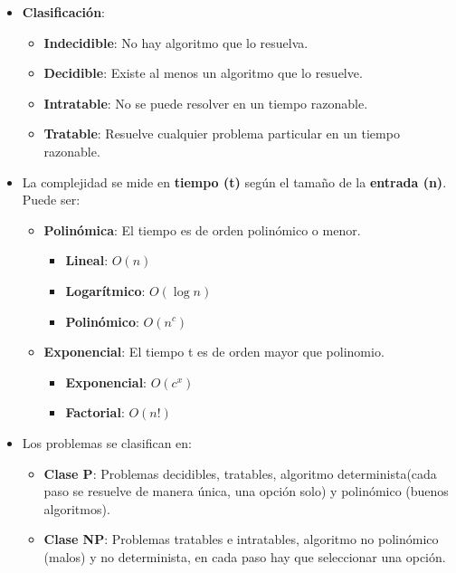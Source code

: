 \documentclass[12pt, twoside, openright]{report} %
\begin{document}
  \begin{itemize}
  \item \textbf{Clasificación}:
    

    \begin{itemize}
    \item \textbf{Indecidible}: No hay algoritmo que lo resuelva.
      
    \item \textbf{Decidible}: Existe al menos un algoritmo que lo resuelve.
      
    \item \textbf{Intratable}: No se puede resolver en un tiempo razonable.
      
    \item \textbf{Tratable}: Resuelve cualquier problema particular en un
      tiempo razonable.
      
    \end{itemize}
  \item La complejidad se mide en \textbf{tiempo (t)} según el tamaño de la
    \textbf{entrada (n)}. Puede ser:
    

    \begin{itemize}
    \item \textbf{Polinómica}: El tiempo es de orden polinómico o menor.
      

      \begin{itemize}
      \item \textbf{Lineal}: $O(n)$
        
      \item \textbf{Logarítmico}: $O(\log n)$
        
      \item \textbf{Polinómico}: $O(n^c)$
        
      \end{itemize}
    \item \textbf{Exponencial}: El tiempo t es de orden mayor que polinomio.
      

      \begin{itemize}
      \item \textbf{Exponencial}: $O(c^x)$
        
      \item \textbf{Factorial}: $O(n!)$
        
      \end{itemize}
    \end{itemize}
  \item Los problemas se clasifican en:
    

    \begin{itemize}
    \item \textbf{Clase P}: Problemas decidibles, tratables, algoritmo
      determinista(cada paso se resuelve de manera única, una opción
      solo) y polinómico (buenos algoritmos).
      
    \item \textbf{Clase NP}: Problemas tratables e intratables, algoritmo no
      polinómico (malos) y no determinista, en cada paso hay que seleccionar una opción.
      
    \end{itemize}
  \end{itemize}
\end{document}
